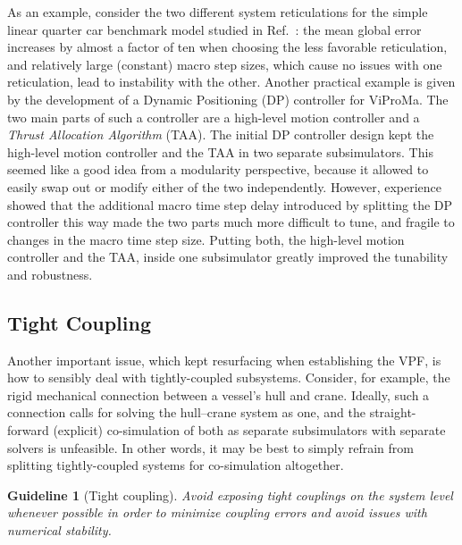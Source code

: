 \documentclass[prb,aps,showpacs,floatfix,twocolumn,10pt]{revtex4-1}
\newcommand{\sub}{subsimulator}
\newcommand{\guidelineTightcoupling}{%
	Avoid exposing tight couplings on the system level whenever possible in order to minimize coupling errors and avoid issues with numerical stability.
}
\theoremstyle{plain}
\newtheorem{guideline}{Guideline}
\theoremstyle{remark}
\begin{document}
As an example, consider the two different system reticulations for the simple linear quarter car benchmark model studied in Ref.~:
the mean global error increases by almost a factor of ten when choosing the less favorable reticulation, and relatively large (constant) macro step sizes, which cause no issues with one reticulation, lead to instability with the other.
Another practical example is given by the development of a Dynamic Positioning (DP) controller for ViProMa.
The two main parts of such a controller are a high-level motion controller and a \emph{Thrust Allocation Algorithm} (TAA).
The initial DP controller design kept the high-level motion controller and the TAA in two separate \sub{}s.
This seemed like a good idea from a modularity perspective, because it allowed to easily swap out or modify either of the two independently.
However, experience showed that the additional macro time step delay introduced by splitting the DP controller this way made the two parts much more difficult to tune, and fragile to changes in the macro time step size.
Putting both, the high-level motion controller and the TAA, inside one \sub{} greatly improved the tunability and robustness.


\subsection{Tight Coupling}
\label{subsec:construction:tight-coupling}

Another important issue, which kept resurfacing when establishing the VPF, is how to sensibly deal with tightly-coupled subsystems.
Consider, for example, the rigid mechanical connection between a vessel's hull and crane.
Ideally, such a connection calls for solving the hull--crane system as one, and the straight-forward (explicit) co-simulation of both as separate \sub{}s with separate solvers is unfeasible.
In other words, it may be best to simply refrain from splitting tightly-coupled systems for co-simulation altogether.

\begin{guideline}[Tight coupling]
\label{guideline:Tightcoupling}
	\guidelineTightcoupling{}
\end{guideline}
\end{document}
